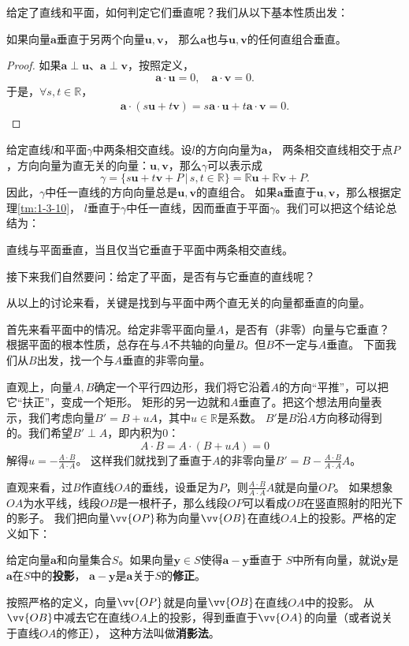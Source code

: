 \documentclass[12pt,UTF8]{ctexbook}
\begin{document}
给定了直线和平面，如何判定它们垂直呢？我们从以下基本性质出发：
\begin{tm}\label{tm:1-3-10}
    如果向量$\mathbf{a}$垂直于另两个向量$\mathbf{u},\mathbf{v}$，
    那么$\mathbf{a}$也与$\mathbf{u},\mathbf{v}$的任何直组合垂直。
\end{tm}
\begin{proof}
    如果$\mathbf{a}\perp \mathbf{u}$、$\mathbf{a}\perp \mathbf{v}$，按照定义，
    $$ \mathbf{a}\cdot \mathbf{u} = 0, \quad \mathbf{a}\cdot \mathbf{v} = 0. $$
    于是，$\forall s, t\in\mathbb{R}$，
    \begin{align*}
        \mathbf{a}\cdot (s\mathbf{u} + t\mathbf{v}) = s\mathbf{a}\cdot \mathbf{u} + t\mathbf{a}\cdot \mathbf{v} = 0. 
    \end{align*}
\end{proof}

给定直线$l$和平面$\gamma$中两条相交直线。设$l$的方向向量为$\mathbf{a}$，
两条相交直线相交于点$P$，方向向量为直无关的向量：$\mathbf{u},\mathbf{v}$，那么$\gamma$可以表示成
$$ \gamma = \{s\mathbf{u} + t\mathbf{v} + P \, | \, s,t\in\mathbb{R}\} = \mathbb{R}\mathbf{u} + \mathbb{R}\mathbf{v} + P. $$
因此，$\gamma$中任一直线的方向向量总是$\mathbf{u},\mathbf{v}$的直组合。
如果$\mathbf{a}$垂直于$\mathbf{u},\mathbf{v}$，那么根据定理\ref{tm:1-3-10}，
$l$垂直于$\gamma$中任一直线，因而垂直于平面$\gamma$。我们可以把这个结论总结为：
\begin{tm}\label{tm:1-3-20}
    直线与平面垂直，当且仅当它垂直于平面中两条相交直线。
\end{tm}
接下来我们自然要问：给定了平面，是否有与它垂直的直线呢？

从以上的讨论来看，关键是找到与平面中两个直无关的向量都垂直的向量。

首先来看平面中的情况。给定非零平面向量$A$，是否有（非零）向量与它垂直？
根据平面的根本性质，总存在与$A$不共轴的向量$B$。但$B$不一定与$A$垂直。
下面我们从$B$出发，找一个与$A$垂直的非零向量。

直观上，向量$A,B$确定一个平行四边形，我们将它沿着$A$的方向“平推”，可以把它“扶正”，变成一个矩形。
矩形的另一边就和$A$垂直了。把这个想法用向量表示，我们考虑向量$B' = B + uA$，其中$u\in\mathbb{R}$是系数。
$B'$是$B$沿$A$方向移动得到的。我们希望$B'\perp A$，即内积为$0$：
$$ A\cdot B = A\cdot (B + uA) = 0$$
解得$u = -\frac{A\cdot B}{A\cdot A}$。
这样我们就找到了垂直于$A$的非零向量$B' = B -\frac{A\cdot B}{A\cdot A}A$。

直观来看，过$B$作直线$OA$的垂线，设垂足为$P$，则$\frac{A\cdot B}{A\cdot A}A$就是向量$OP$。
如果想象$OA$为水平线，线段$OB$是一根杆子，那么线段$OP$可以看成$OB$在竖直照射的阳光下的影子。
我们把向量$\vv{OP}$称为向量$\vv{OB}$在直线$OA$上的投影。严格的定义如下：
\begin{df}\label{df:1-3-20}
    给定向量$\mathbf{a}$和向量集合$S$。如果向量$\mathbf{y}\in S$使得$\mathbf{a} - \mathbf{y}$垂直于
    $S$中所有向量，就说$\mathbf{y}$是$\mathbf{a}$在$S$中的\textbf{投影}，
    $\mathbf{a} - \mathbf{y}$是$\mathbf{a}$关于$S$的\textbf{修正}。
\end{df}
按照严格的定义，向量$\vv{OP}$就是向量$\vv{OB}$在直线$OA$中的投影。
从$\vv{OB}$中减去它在直线$OA$上的投影，得到垂直于$\vv{OA}$的向量（或者说关于直线$OA$的修正），
这种方法叫做\textbf{消影法}。
\end{document}
